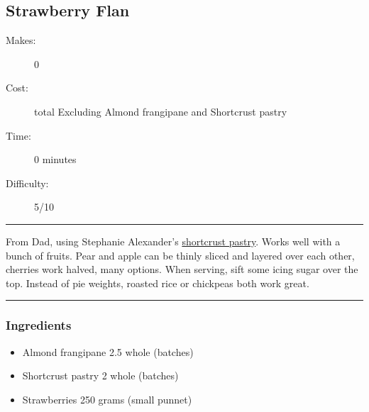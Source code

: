 \documentclass[]{article}
\begin{document}
\subsection*{\center\huge Strawberry Flan}
\begin{description}
\item[Makes:] 0 
\item[Cost:]  total Excluding Almond frangipane and Shortcrust pastry
\item[Time:] 0 minutes
\item[Difficulty:] 5/10
\end{description}
\vspace{0.2cm}\hrule\vspace{0.5cm}
\begin{adjustwidth}{0.5 cm}{0.5 cm}

From Dad, using Stephanie Alexander's \hyperref[rec:Shortcrust Pastry]{shortcrust pastry}. Works well with a bunch of fruits. Pear and apple can be thinly sliced and layered over each other, cherries work halved, many options. When serving, sift some icing sugar over the top. Instead of pie weights, roasted rice or chickpeas both work great.  \hfill{}\color{black}

\end{adjustwidth}
\vspace{0.5cm}\hrule
\subsubsection*{\Large Ingredients}
\begin{multicols}{2}
\begin{itemize}
 \item Almond frangipane \hfill 2.5 whole (batches)
 \item Shortcrust pastry \hfill 2 whole (batches)
 \item Strawberries \hfill 250 grams (small punnet)
\end{itemize}
\end{multicols}
\end{document}
